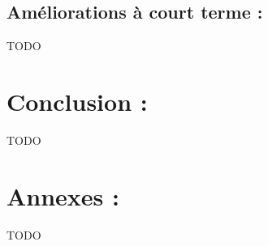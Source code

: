 \documentclass[12pt, a4paper]{article}
\begin{document}
\subsection{Améliorations à court terme :}
TODO


\clearpage

\section{Conclusion :}
TODO



\section{Annexes :}
TODO
\end{document}
